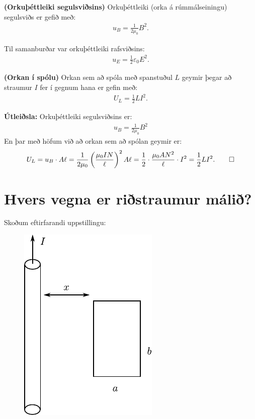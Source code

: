 \begin{tcolorbox}
\begin{theorem}
\textbf{(Orkuþéttleiki segulsviðsins)} Orkuþéttleiki (orka á rúmmálseiningu) segulsviðs er gefið með:
\begin{align*}
    u_B = \frac{1}{2\mu_0}B^2.
\end{align*}
\end{theorem}
\end{tcolorbox}

Til samanburðar var orkuþéttleiki rafsviðsins:
\begin{align*}
    u_E = \frac{1}{2}\varepsilon_0 E^2.
\end{align*}



\begin{tcolorbox}
\begin{theorem}
\textbf{(Orkan í spólu)} Orkan sem að spóla með spanstuðul $L$ geymir þegar að straumur $I$ fer í gegnum hana er gefin með:
\begin{align*}
    U_L = \frac{1}{2}LI^2.
\end{align*}
\end{theorem}
\end{tcolorbox}

\textbf{Útleiðsla:} Orkuþéttleiki segulsviðsins er:
\begin{align*}
    u_B = \frac{1}{2\mu_0}B^2
\end{align*}
En þar með höfum við að orkan sem að spólan geymir er:
\begin{align*}
   U_L =  u_B \cdot A \ell = \frac{1}{2\mu_0} \left( \frac{\mu_0 I N}{\ell} \right)^2 A \ell = \frac{1}{2} \cdot \frac{\mu_0 A N^2}{\ell} \cdot I^2 = \frac{1}{2}L I^2. \qed
\end{align*}

\section{Hvers vegna er riðstraumur málið?}

Skoðum eftirfarandi uppstillingu:

\begin{figure}[H]
    \centering
    \includegraphics{figures/straumur-vir.pdf}
\end{figure}

